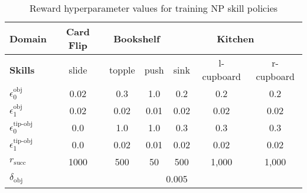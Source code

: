 \begin{table}[H]
\centering
\begin{adjustbox}{width=0.5\textwidth} %
\begin{tabular}{|l|c|c|c|c|c|c|}
\hline
\textbf{Domain} & \textbf{Card Flip} & \multicolumn{2}{c|}{\textbf{Bookshelf}} & \multicolumn{3}{c|}{\textbf{Kitchen}} \\ \hline
\textbf{Skills} & slide & topple & push & sink & l-cupboard & r-cupboard \\ \hline
$\epsilon_0^{\text{obj}}$       & 0.02 & 0.3 & 1.0  & 0.2 & 0.2 & 0.2 \\ \hline
$\epsilon_1^{\text{obj}}$       & 0.02 & 0.02 & 0.01 & 0.02 & 0.02 & 0.02 \\ \hline
$\epsilon_0^{\text{tip-obj}}$ & 0.0 & 1.0 & 1.0 & 0.3 & 0.3 & 0.3  \\ \hline
$\epsilon_1^{\text{tip-obj}}$ & 0.0 & 0.02 & 0.01 & 0.02 & 0.02 & 0.02 \\ \hline
$r_{\text{succ}}$ & 1000 & 500 & 50  & 500 & 1,000  & 1,000\\ \hline
$\delta_{\text{obj}}$ & \multicolumn{6}{c|}{0.005}  \\ \hline
\end{tabular}
\end{adjustbox}
\caption{Reward hyperparameter values for training NP skill policies}\label{table:NP_reward}
\end{table}
